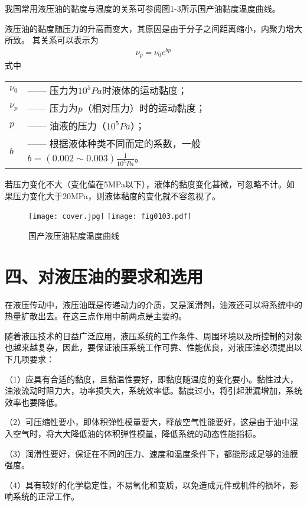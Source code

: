 我国常用液压油的黏度与温度的关系可参阅图1-3所示国产油黏度温度曲线。

液压油的黏度随压力的升高而变大，其原因是由于分子之间距离缩小，内聚力增大所致。
其关系可以表示为
\begin{gather}
    {\nu_{p}}={\nu_{0}}{e}^{bp} 
\end{gather}
    \newpage  
    \noindent 式中\ 
    \begin{tabular}[t]{ll}
        ${\nu_{0}}$ & —— 压力为$10^5Pa$时液体的运动黏度；\\
        ${\nu_{p}}$ & —— 压力为$p$（相对压力）时的运动黏度；\\
        $p$ & —— 油液的压力（$10^5Pa$）； \\
        $b$ & —— 根据液体种类不同而定的系数，一般$b=( 0.002\sim0.003)        {\frac {1}  { 10^{5} Pa} } $。
    \end{tabular}

    若压力变化不大（变化值在5MPa以下），液体的黏度变化甚微，可忽略不计。如果压力变化大于20MPa，则液体黏度的变化就不容忽视了。

    \begin{figure}[!hbt]
        \centering
        \ifOpenSource
        \texttt{[image: cover.jpg]}
        \else
        \texttt{[image: fig0103.pdf]}
        \fi
        \caption{国产液压油粘度温度曲线}
        \label{fig:fig0103}
        \end{figure}

          \section*{四、对液压油的要求和选用}
在液压传动中，液压油既是传递动力的介质，又是润滑剂，油液还可以将系统中的热量扩散出去。在这三点作用中前两点是主要的。

随着液压技术的日益广泛应用，液压系统的工作条件、周围环境以及所控制的对象也越来越复杂，因此，要保证液压系统工作可靠、性能优良，对液压油必须提出以下几项要求：

（1）应具有合适的黏度，且黏温性要好，即黏度随温度的变化要小。黏性过大，油液流动时阻力大，功率损失大，系统效率低。黏度过小，将引起泄漏增加，系统效率也要降低。

（2）可压缩性要小，即体积弹性模量要大，释放空气性能要好，这是由于油中混入空气时，将大大降低油的体积弹性模量，降低系统的动态性能指标。

（3）润滑性要好，保证在不同的压力、速度和温度条件下，都能形成足够的油膜强度。

（4）具有较好的化学稳定性，不易氧化和变质，以免造成元件或机件的损坏，影响系统的正常工作。

